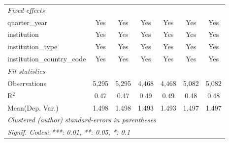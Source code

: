 \begin{tabular}{lcccccc}
   \midrule
   \emph{Fixed-effects}\\
   quarter\_year                      & Yes     & Yes         & Yes     & Yes          & Yes     & Yes\\  
   institution                        & Yes     & Yes         & Yes     & Yes          & Yes     & Yes\\  
   institution\_type                  & Yes     & Yes         & Yes     & Yes          & Yes     & Yes\\  
   institution\_country\_code         & Yes     & Yes         & Yes     & Yes          & Yes     & Yes\\  
   \midrule
   \emph{Fit statistics}\\
   Observations                       & 5,295   & 5,295       & 4,468   & 4,468        & 5,082   & 5,082\\  
   R$^2$                              & 0.47    & 0.47        & 0.49    & 0.49         & 0.48    & 0.48\\  
Mean(Dep. Var.) & 1.498 & 1.498 & 1.493 & 1.493 & 1.497 & 1.497 \\
   \midrule \midrule
   \multicolumn{7}{l}{\emph{Clustered (author) standard-errors in parentheses}}\\
   \multicolumn{7}{l}{\emph{Signif. Codes: ***: 0.01, **: 0.05, *: 0.1}}\\
\end{tabular}
\par\endgroup
